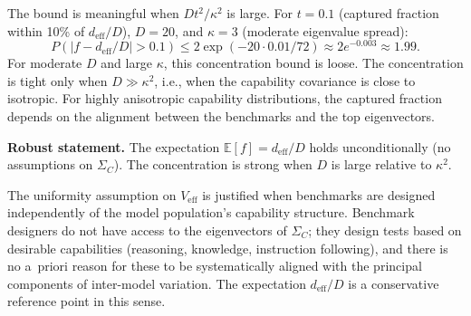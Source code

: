 \begin{remark}
The bound is meaningful when $D t^2 / \kappa^2$ is large. For $t = 0.1$ (captured fraction within 10\% of $d_{\mathrm{eff}}/D$), $D = 20$, and $\kappa = 3$ (moderate eigenvalue spread):
\[
  P(|f - d_{\mathrm{eff}}/D| > 0.1) \leq 2\exp(-20 \cdot 0.01 / 72) \approx 2e^{-0.003} \approx 1.99.
\]
For moderate $D$ and large $\kappa$, this concentration bound is loose. The concentration is tight only when $D \gg \kappa^2$, i.e., when the capability covariance is close to isotropic. For highly anisotropic capability distributions, the captured fraction depends on the alignment between the benchmarks and the top eigenvectors.

\textbf{Robust statement.} The expectation $\mathbb{E}[f] = d_{\mathrm{eff}}/D$ holds unconditionally (no assumptions on $\Sigma_C$). The concentration is strong when $D$ is large relative to $\kappa^2$.
\end{remark}

\begin{remark}
The uniformity assumption on $V_{\mathrm{eff}}$ is justified when benchmarks are designed independently of the model population's capability structure. Benchmark designers do not have access to the eigenvectors of $\Sigma_C$; they design tests based on desirable capabilities (reasoning, knowledge, instruction following), and there is no a~priori reason for these to be systematically aligned with the principal components of inter-model variation. The expectation $d_{\mathrm{eff}}/D$ is a conservative reference point in this sense.
\end{remark}
